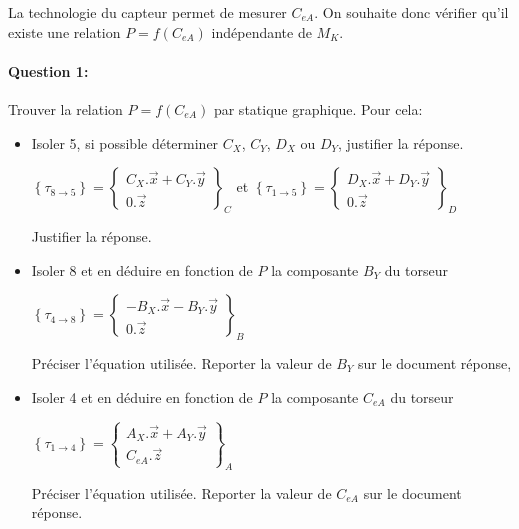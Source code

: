 La technologie du capteur permet de mesurer $C_{eA}$. On souhaite donc vérifier qu'il existe une relation $P=f(C_{eA})$ indépendante de $M_K$.

\paragraph{Question 1:} Trouver la relation $P=f(C_{eA})$ par statique graphique. Pour cela:

\begin{itemize}
 \item Isoler 5, si possible déterminer $C_X$, $C_Y$, $D_X$ ou $D_Y$, justifier la réponse.

$\left\{\tau_{8 \rightarrow 5}\right\}=\left\{
\begin{array}{c}
C_X.\overrightarrow{x}+C_Y.\overrightarrow{y} \\
0.\overrightarrow{z}
\end{array}\right\}_C$ et $\left\{\tau_{1 \rightarrow 5}\right\}=\left\{
\begin{array}{c}
D_X.\overrightarrow{x}+D_Y.\overrightarrow{y} \\
0.\overrightarrow{z}
\end{array}\right\}_D$

Justifier la réponse.
 \item Isoler 8 et en déduire en fonction de $P$ la composante $B_Y$ du torseur

$\left\{\tau_{4 \rightarrow 8}\right\}=\left\{
\begin{array}{c}
-B_X.\overrightarrow{x}-B_Y.\overrightarrow{y} \\
0.\overrightarrow{z}
\end{array}\right\}_B$

Préciser l'équation utilisée. Reporter la valeur de $B_Y$ sur le document réponse,

 \item Isoler 4 et en déduire en fonction de $P$ la composante $C_{eA}$ du torseur 

$\left\{\tau_{1 \rightarrow 4}\right\}=\left\{
\begin{array}{c}
A_X.\overrightarrow{x}+A_Y.\overrightarrow{y} \\
C_{eA}.\overrightarrow{z}
\end{array}\right\}_A$

Préciser l'équation utilisée. Reporter la valeur de $C_{eA}$ sur le document réponse.
\end{itemize}

